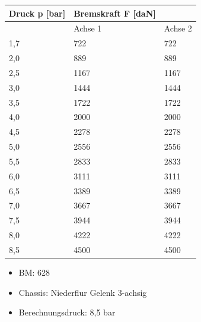 \documentclass{vorlage-design-main}
\begin{document}
\begin{table}[ht]
  \begin{tabular}{@{}lll@{}}
  \toprule

Druck p {[}bar{]} & Bremskraft F {[}daN{]} & \\
\midrule[\heavyrulewidth]
& Achse 1 & Achse 2 \\
1,7 & 722 & 722 \\
2,0 & 889 & 889 \\
2,5 & 1167 & 1167 \\
3,0 & 1444 & 1444 \\
3,5 & 1722 & 1722 \\
4,0 & 2000 & 2000 \\
4,5 & 2278 & 2278 \\
5,0 & 2556 & 2556 \\
5,5 & 2833 & 2833 \\
6,0 & 3111 & 3111 \\
6,5 & 3389 & 3389 \\
7,0 & 3667 & 3667 \\
7,5 & 3944 & 3944 \\
8,0 & 4222 & 4222 \\
8,5 & 4500 & 4500 \\
  \bottomrule
  \end{tabular}%
\end{table}

\begin{itemize}

\item
  BM: 628
\item
  Chassis: Niederflur Gelenk 3-achsig
\item
  Berechnungsdruck: 8,5 bar
\end{itemize}
\end{document}
